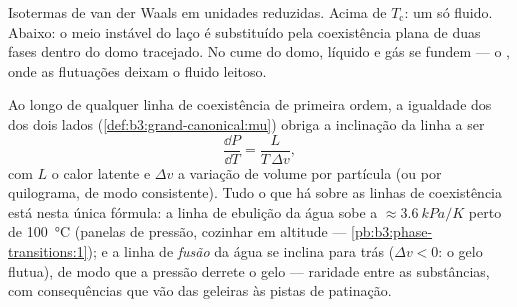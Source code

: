 \begin{omfigure}

{\small Isotermas de van der Waals em unidades reduzidas. Acima de
$T_{\text{c}}$: um só fluido. Abaixo: o meio instável do laço é
substituído pela coexistência plana de duas fases dentro do domo
tracejado. No cume do domo, líquido e gás se fundem --- o , onde as flutuações deixam o fluido leitoso.}
\end{omfigure}

\begin{proposition}\label{prop:b3:phase-transitions:clapeyron}
Ao longo de qualquer linha de coexistência de primeira ordem, a
igualdade dos  dos dois lados
(\cref{def:b3:grand-canonical:mu}) obriga a inclinação da linha a ser
\[
\frac{\dd P}{\dd T} = \frac{L}{T\,\Delta v} ,
\]
com $L$ o calor latente e $\Delta v$ a variação de volume por
partícula (ou por quilograma, de modo consistente). Tudo o que há sobre
as linhas de coexistência está nesta única fórmula: a linha de ebulição
da água sobe a $\approx\qty{3.6}{kPa/K}$ perto de \qty{100}{\celsius}
(panelas de pressão, cozinhar em altitude ---
\cref{pb:b3:phase-transitions:1}); e a linha de \emph{fusão} da água
se inclina para trás ($\Delta v < 0$: o gelo flutua), de modo que a
pressão derrete o gelo --- raridade entre as substâncias, com
consequências que vão das geleiras às pistas de patinação.
\end{proposition}

